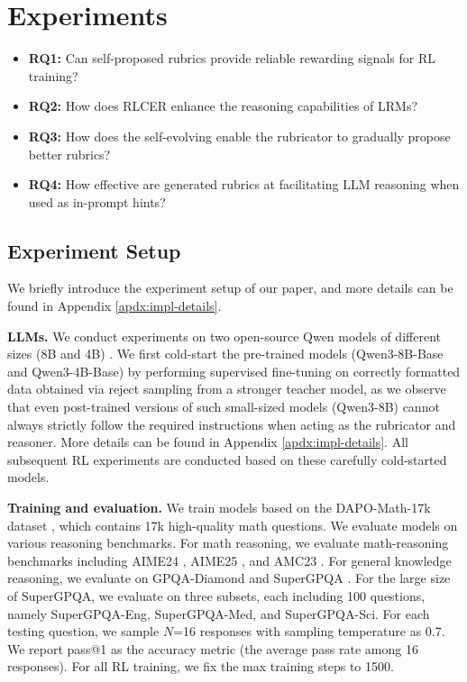 \section{Experiments}

\begin{itemize}[leftmargin=*]
    \item \textbf{RQ1:} Can self-proposed rubrics provide reliable rewarding signals for RL training?
    \item \textbf{RQ2:} How does RLCER enhance the reasoning capabilities of LRMs?
    \item \textbf{RQ3:} How does the self-evolving enable the rubricator to gradually propose better rubrics?
    \item \textbf{RQ4:} How effective are generated rubrics at facilitating LLM reasoning when used as in-prompt hints?
\end{itemize}

\subsection{Experiment Setup}
We briefly introduce the experiment setup of our paper, and more details can be found in Appendix \ref{apdx:impl-details}. 


\textbf{LLMs.} 
We conduct experiments on two open-source Qwen models of different sizes (8B and 4B) \cite{Qwen3}.
We first cold-start the pre-trained models (\ie Qwen3-8B-Base and Qwen3-4B-Base) by performing supervised fine-tuning on correctly formatted data obtained via reject sampling from a stronger teacher model, as we observe that even post-trained versions of such small-sized models (\eg Qwen3-8B) cannot always strictly follow the required instructions when acting as the rubricator and reasoner. 
More details can be found in Appendix \ref{apdx:impl-details}.
All subsequent RL experiments are conducted based on these carefully cold-started models.

\textbf{Training and evaluation.} 
We train models based on the DAPO-Math-17k dataset \cite{DAPO}, which contains 17k high-quality math questions. 
We evaluate models on various reasoning benchmarks.
For math reasoning, we evaluate math-reasoning benchmarks including AIME24 \cite{AIME}, AIME25 \cite{AIME}, and AMC23 \cite{aimo_amc_2023}.
For general knowledge reasoning, we evaluate on GPQA-Diamond \cite{GPQA} and SuperGPQA \cite{SuperGPQA}. 
For the large size of SuperGPQA, we evaluate on three subsets, each including 100 questions, namely SuperGPQA-Eng, SuperGPQA-Med, and SuperGPQA-Sci. 
For each testing question, we sample $N$=16 responses with sampling temperature as 0.7.
We report pass@1 as the accuracy metric (\ie the average pass rate among 16 responses).
For all RL training, we fix the max training steps to 1500.

